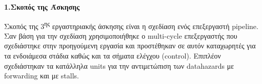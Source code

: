 { \large \bfseries 1.Σκοπός της Άσκησης}\\ %

\begin{justify}
    Σκοπός της 3\textsuperscript{ης} εργαστηριακής άσκησης
    είναι η σχεδίαση ενός επεξεργαστή \textlatin{pipeline}.
    Σαν βάση για την σχεδίαση χρησιμοποιήθηκε ο \textlatin{multi-cycle}
    επεξεργαστής που σχεδιάστηκε στην προηγούμενη εργασία
    και προστέθηκαν σε αυτόν καταχωρητές για τα ενδοιάμεσα
    στάδια καθώς και τα σήματα ελέγχου (\textlatin{control}).
    Επιπλέον σχεδιάστηκαν τα κατάλληλα \textlatin{units}
    για την αντιμετώπιση των \textlatin{datahazards} με
    \textlatin{forwarding} και με \textlatin{stalls}.
\end{justify}


\vspace{0.5cm}